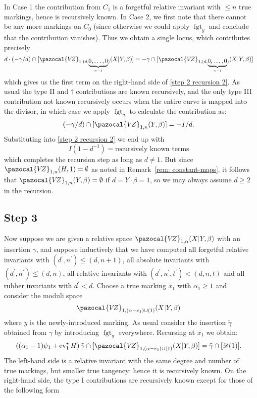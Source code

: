 \documentclass[11pt]{amsart}
\newcommand{\VZ}{\pazocal{V\!Z}}
\newcommand{\st}{\star}
\newcommand{\ev}{\operatorname{ev}}
\newcommand{\fgt}{\operatorname{fgt}}
\newcommand{\Dcal}{\mathcal{D}}
\theoremstyle{definition}
\theoremstyle{definition}
\begin{document}
In Case 1 the contribution from $C_1$ is a forgetful relative invariant with $\leq n$ true markings, hence is recursively known. In Case 2, we first note that there cannot be any more markings on $C_0$ (since otherwise we could apply $\fgt_y$ and conclude that the contribution vanishes). Thus we obtain a single locus, which contributes precisely
\begin{equation*} d\cdot(-\gamma/d) \cap [\VZ_{1,(d,\underbrace{0,\ldots,0}_{n-1})}(X|Y,\beta)] = -\gamma\cap[\VZ_{1,(d,\underbrace{0,\ldots,0}_{n-1})}(X|Y,\beta)]\end{equation*}
which gives us the first term on the right-hand side of \eqref{step 2 recursion 2}. As usual the type II and $\dag$ contributions are known recursively, and the only type III contribution not known recursively occurs when the entire curve is mapped into the divisor, in which case we apply $\fgt_y$ to calculate the contribution as:
\begin{equation*} (-\gamma/d) \cap [\VZ_{1,n}(Y,\beta)] = -I/d.\end{equation*}
Substituting into \eqref{step 2 recursion 2} we end up with
\begin{equation*} I(1-d^{-1}) = \text{recursively known terms} \end{equation*}
which completes the recursion step as long as $d \neq 1$. But since $\VZ_{1,n}(H,1)=\emptyset$ as noted in Remark~\ref{rem: constant-maps}, it follows that $\VZ_{1,n}(Y,\beta)=\emptyset$ if $d=Y\cdot\beta=1$, so we may always assume $d \geq 2$ in the recursion.

\subsection*{Step 3} Now suppose we are given a relative space $\VZ_{1,\alpha}(X|Y,\beta)$ with an insertion $\gamma$, and suppose inductively that we have computed all forgetful relative invariants with $(d^\prime,n^\prime) \leq (d,n+1)$, all absolute invariants with $(d^\prime,n^\prime) \leq (d,n)$, all relative invariants with $(d^\prime,n^\prime,t^\prime)<(d,n,t)$ and all rubber invariants with $d^\prime < d$. Choose a true marking $x_1$ with $\alpha_1 \geq 1$ and consider the moduli space
\begin{equation*} \VZ_{1,(\alpha-e_1)\cup(1)}(X|Y,\beta) \end{equation*}
where $y$ is the newly-introduced marking. As usual consider the insertion $\tilde\gamma$ obtained from $\gamma$ by introducing $\fgt_y$ everywhere. Recursing at $x_1$ we obtain:
\begin{equation*} \left( (\alpha_1-1)\psi_1 + \ev_1^\st H\right) \tilde\gamma \cap [\VZ_{1,(\alpha-e_1)\cup(1)}(X|Y,\beta)] = \tilde\gamma \cap [\Dcal(1)].\end{equation*}
The left-hand side is a relative invariant with the same degree and number of true markings, but smaller true tangency: hence it is recursively known. On the right-hand side, the type I contributions are recursively known except for those of the following form
\end{document}
